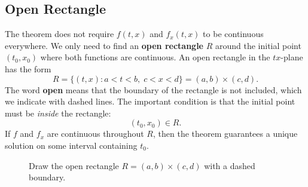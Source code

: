 \documentclass[11pt,letterpaper]{article}
\begin{document}
\subsection{Open Rectangle}

The theorem does not require $f(t,x)$ and $f_x(t,x)$ to be continuous
everywhere. We only need to find an \textbf{open rectangle} $R$ around the
initial point $(t_0,x_0)$ where both functions are continuous. An open rectangle in the $tx$-plane has the form
\[
R=\{(t,x):a<t<b,\;c<x<d\}
  =(a,b)\times(c,d).
\]
The word \textbf{open} means that the boundary of the rectangle is not
included, which we indicate with dashed lines. The important condition is that the initial point must be \textit{inside}
the rectangle:
\[
(t_0,x_0)\in R.
\]
If $f$ and $f_x$ are continuous throughout $R$, then the theorem guarantees
a unique solution on some interval containing $t_0$.

\begin{figure}[H]
    \centering
{}
    \caption{Draw the open rectangle $R=(a,b)\times(c,d)$ with a dashed boundary.}
\end{figure}
\end{document}
